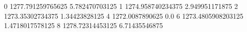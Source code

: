 0 1277.791259765625 5.782470703125
1 1274.958740234375 2.949951171875
2 1273.35302734375 1.34423828125
4 1272.0087890625 0.0
6 1273.4805908203125 1.4718017578125
8 1278.72314453125 6.71435546875

